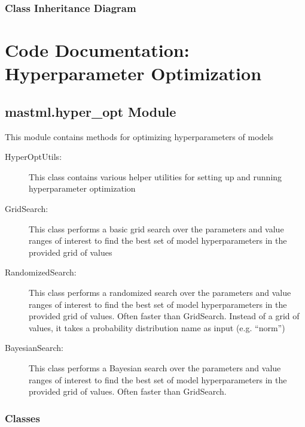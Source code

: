 \documentclass[letterpaper,10pt,english]{sphinxmanual}
\begin{document}
\subsection{Class Inheritance Diagram}
\label{\detokenize{6_feature_selectors:class-inheritance-diagram}}


\chapter{Code Documentation: Hyperparameter Optimization}
\label{\detokenize{7_hyper_opt:code-documentation-hyperparameter-optimization}}\label{\detokenize{7_hyper_opt::doc}}

\section{mastml.hyper\_opt Module}
\label{\detokenize{7_hyper_opt:module-mastml.hyper_opt}}\label{\detokenize{7_hyper_opt:mastml-hyper-opt-module}}
This module contains methods for optimizing hyperparameters of models
\begin{description}
\item[{HyperOptUtils:}] \leavevmode
This class contains various helper utilities for setting up and running hyperparameter optimization

\item[{GridSearch:}] \leavevmode
This class performs a basic grid search over the parameters and value ranges of interest to find the best
set of model hyperparameters in the provided grid of values

\item[{RandomizedSearch:}] \leavevmode
This class performs a randomized search over the parameters and value ranges of interest to find the best
set of model hyperparameters in the provided grid of values. Often faster than GridSearch. Instead of a grid
of values, it takes a probability distribution name as input (e.g. “norm”)

\item[{BayesianSearch:}] \leavevmode
This class performs a Bayesian search over the parameters and value ranges of interest to find the best
set of model hyperparameters in the provided grid of values. Often faster than GridSearch.

\end{description}


\subsection{Classes}
\label{\detokenize{7_hyper_opt:classes}}
\end{document}
